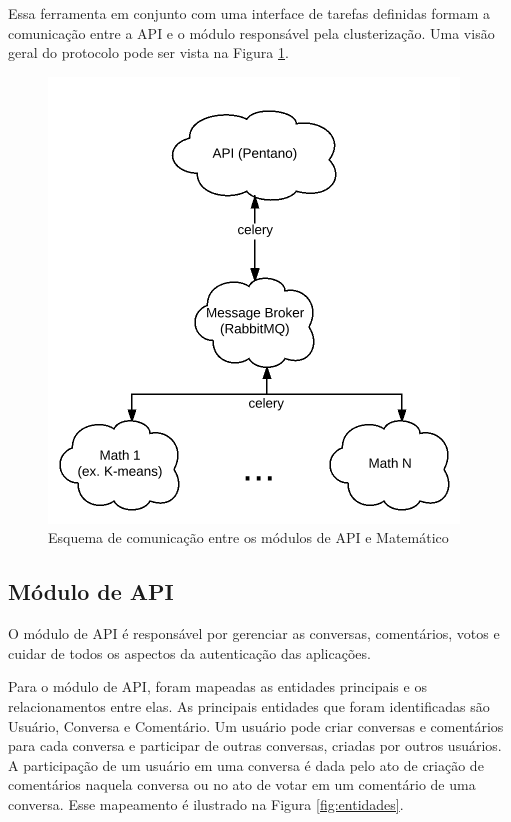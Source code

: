     Essa ferramenta em conjunto com uma interface de tarefas definidas formam
    a comunicação entre a API e o módulo responsável pela clusterização. 
    Uma visão geral do protocolo pode ser vista na Figura \ref{fig:protocolo}.

    \begin{figure}[bt!]
    \centering
    \includegraphics[scale=0.6]{figuras/protocolo.png}
    \caption{Esquema de comunicação entre os módulos de API e Matemático}
    \label{fig:protocolo}
    \end{figure}
    
    
    \subsection{Módulo de API}

	O módulo de API é responsável por gerenciar as conversas, comentários, votos
	e cuidar de todos os aspectos da autenticação das aplicações. 

	Para o módulo de API, foram mapeadas as entidades principais e os relacionamentos entre elas. 
	As principais entidades que foram identificadas são Usuário, Conversa e Comentário. Um usuário pode criar
	conversas e comentários para cada conversa e participar de outras conversas, criadas por outros usuários.
	A participação de um usuário em uma conversa é dada pelo ato de criação de comentários naquela conversa ou
	no ato de votar em um comentário de uma conversa. Esse mapeamento é ilustrado na Figura \ref{fig:entidades}.

